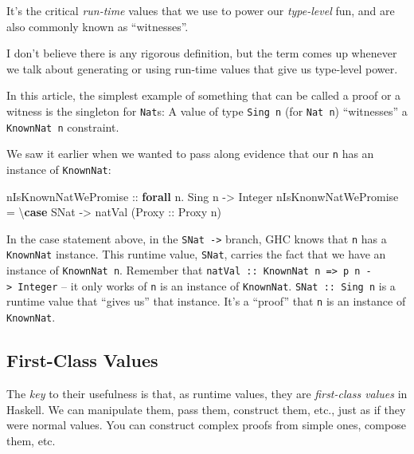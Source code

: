 \documentclass[]{article}
\newenvironment{Shaded}{}{}
\newcommand{\DataTypeTok}[1]{\textcolor[rgb]{0.56,0.13,0.00}{#1}}
\newcommand{\KeywordTok}[1]{\textcolor[rgb]{0.00,0.44,0.13}{\textbf{#1}}}
\newcommand{\NormalTok}[1]{#1}
\newcommand{\OperatorTok}[1]{\textcolor[rgb]{0.40,0.40,0.40}{#1}}
\newcommand{\OtherTok}[1]{\textcolor[rgb]{0.00,0.44,0.13}{#1}}
\begin{document}
It's the critical \emph{run-time} values that we use to power our
\emph{type-level} fun, and are also commonly known as ``witnesses''.

I don't believe there is any rigorous definition, but the term comes up whenever
we talk about generating or using run-time values that give us type-level power.

In this article, the simplest example of something that can be called a proof or
a witness is the singleton for \texttt{Nat}s: A value of type \texttt{Sing\ n}
(for \texttt{Nat\ n}) ``witnesses'' a \texttt{KnownNat\ n} constraint.

We saw it earlier when we wanted to pass along evidence that our \texttt{n} has
an instance of \texttt{KnownNat}:

\begin{Shaded}
\begin{Highlighting}[]
\OtherTok{nIsKnownNatWePromise ::} \KeywordTok{forall}\NormalTok{ n}\OperatorTok{.} \DataTypeTok{Sing}\NormalTok{ n }\OtherTok{{-}\textgreater{}} \DataTypeTok{Integer}
\NormalTok{nIsKnonwNatWePromise }\OtherTok{=}\NormalTok{ \textbackslash{}}\KeywordTok{case}
    \DataTypeTok{SNat} \OtherTok{{-}\textgreater{}}\NormalTok{ natVal (}\DataTypeTok{Proxy}\OtherTok{ ::} \DataTypeTok{Proxy}\NormalTok{ n)}
\end{Highlighting}
\end{Shaded}

In the case statement above, in the \texttt{SNat\ -\textgreater{}} branch, GHC
knows that \texttt{n} has a \texttt{KnownNat} instance. This runtime value,
\texttt{SNat}, carries the fact that we have an instance of
\texttt{KnownNat\ n}. Remember that
\texttt{natVal\ ::\ KnownNat\ n\ =\textgreater{}\ p\ n\ -\textgreater{}\ Integer}
-- it only works of \texttt{n} is an instance of \texttt{KnownNat}.
\texttt{SNat\ ::\ Sing\ n} is a runtime value that ``gives us'' that instance.
It's a ``proof'' that \texttt{n} is an instance of \texttt{KnownNat}.

\subsection{First-Class Values}\label{first-class-values}

The \emph{key} to their usefulness is that, as runtime values, they are
\emph{first-class values} in Haskell. We can manipulate them, pass them,
construct them, etc., just as if they were normal values. You can construct
complex proofs from simple ones, compose them, etc.
\end{document}
